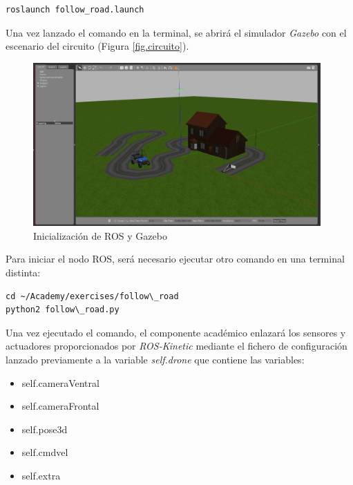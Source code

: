 \lstset{language=bash, breaklines=true, basicstyle=\footnotesize}
\begin{lstlisting}[frame=single]
roslaunch follow_road.launch
\end{lstlisting}

Una vez lanzado el comando en la terminal, se abrirá el simulador \textit{Gazebo} con el escenario del circuito (Figura \ref{fig.circuito}).

\begin{figure}[H]
  \begin{center}
    \includegraphics[width=0.98\textwidth]{figures/roslaunch_fr.png}
		\caption{Inicialización de ROS y Gazebo}
		\label{fig.roslaunchfr}
		\end{center}
\end{figure}

Para iniciar el nodo ROS, será necesario ejecutar otro comando en una terminal distinta:

\lstset{language=bash, breaklines=true, basicstyle=\footnotesize}
\begin{lstlisting}[frame=single]
cd ~/Academy/exercises/follow\_road
python2 follow\_road.py
\end{lstlisting}

Una vez ejecutado el comando, el componente académico enlazará los sensores y actuadores proporcionados por \textit{ROS-Kinetic} mediante el fichero de configuración lanzado previamente a la variable \textit{self.drone} que contiene las variables:

\begin{itemize}
    \item self.cameraVentral
    \item self.cameraFrontal
    \item self.pose3d
    \item self.cmdvel
    \item self.extra
\end{itemize}

